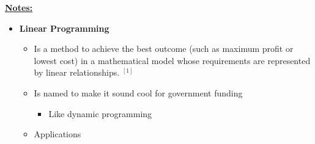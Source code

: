 \documentclass[12pt]{article}
\begin{document}
\begin{enumerate}[1.]










    \bigskip

    \underline{\textbf{Notes:}}

    \bigskip

    \begin{itemize}
        \item \textbf{Linear Programming}
        \begin{itemize}
            \item Is a method to achieve the best outcome (such as maximum profit or lowest cost) in a mathematical model
            whose requirements are represented by linear relationships. $^{[1]}$
            \item Is named to make it sound cool for government funding
            \begin{itemize}
                \item Like dynamic programming
            \end{itemize}
            \item Applications


\end{itemize}
\end{itemize}
\end{enumerate}
\end{document}
